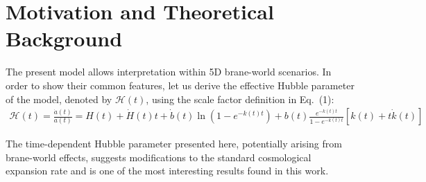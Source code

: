 \documentclass[12pt]{article}  %
\def\bea{\begin{eqnarray}}
\def\eea{\end{eqnarray}}
\begin{document}
\section{Motivation and Theoretical Background}  

The present model allows interpretation within 5D brane-world scenarios. In order to show their common features, let us derive the effective Hubble parameter of the model, denoted by $\mathcal H(t)$, using the scale factor definition in Eq.~(1):  
\bea 
{\mathcal H(t)} = \frac{\dot{a}(t)}{a(t)} = H(t) + \dot{H}(t) t + \dot{b}(t) \ln\left(1 - e^{-k(t)t}\right) + b(t) \frac{e^{-k(t) t}}{1 - e^{-k(t) t}} \left[k(t) + t \dot{k}(t)\right]  
\eea

The time-dependent Hubble parameter presented here, potentially arising from brane-world effects, suggests modifications to the standard cosmological expansion rate and is one of the most interesting results found in this work.
\end{document}
